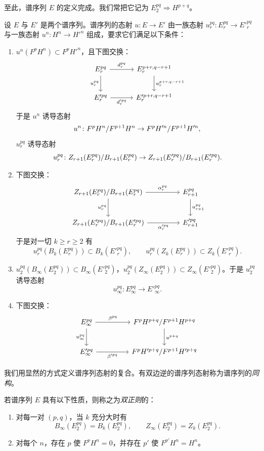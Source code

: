 至此，谱序列 $E$ 的定义完成。我们常把它记为 $E_2^{pq}\Rightarrow H^{p+q}$。

设 $E$ 与 $E'$ 是两个谱序列。谱序列的态射 $u\colon E\to E'$ 由一族态射 $u_r^{pq}\colon E_r^{pq}\to E'^{pq}_r$ 与一族态射 $u^n\colon H^n\to H'^n$ 组成，要求它们满足以下条件：
\begin{enumerate}[label=(\roman*),leftmargin=2.8em]
  \item $u^n(F^pH^n)\subset F^pH'^n$，且下图交换：
  \[\begin{tikzcd}[column sep=3.2em,row sep=2.2em]
  E_r^{pq} \arrow[r,"d_r^{pq}"] \arrow[d,"u_r^{pq}"'] & E_r^{p+r,q-r+1} \arrow[d,"u_r^{p+r,q-r+1}"] \\
  E'^{pq}_r \arrow[r,"d'^{pq}_r"'] & E'^{p+r,q-r+1}_r
  \end{tikzcd}\]
  于是 $u^n$ 诱导态射
  \[
  u^n\colon F^pH^n/F^{p+1}H^n\to F^pH'^n/F^{p+1}H'^n,
  \]
  $u_r^{pq}$ 诱导态射
  \[
  u_r^{pq}\colon Z_{r+1}(E_r^{pq})/B_{r+1}(E_r^{pq})\to Z_{r+1}(E'^{pq}_r)/B_{r+1}(E'^{pq}_r).
  \]
  \item 下图交换：
  \[\begin{tikzcd}[column sep=4.6em,row sep=2.4em]
  Z_{r+1}(E_r^{pq})/B_{r+1}(E_r^{pq}) \arrow[r,"\alpha_r^{pq}"] \arrow[d,"\ol u_r^{pq}"'] & E_{r+1}^{pq} \arrow[d,"u_{r+1}^{pq}"] \\
  Z_{r+1}(E'^{pq}_r)/B_{r+1}(E'^{pq}_r) \arrow[r,"\alpha'^{pq}_r"'] & E'^{pq}_{r+1}
  \end{tikzcd}\]
  于是对一切 $k\ge r\ge 2$ 有
  \[
  u_r^{pq}(B_k(E_r^{pq}))\subset B_k(E'^{pq}_r),\qquad u_r^{pq}(Z_k(E_r^{pq}))\subset Z_k(E'^{pq}_r).
  \]
  \item $u_2^{pq}(B_\infty(E_2^{pq}))\subset B_\infty(E'^{pq}_2)$，$u_2^{pq}(Z_\infty(E_2^{pq}))\subset Z_\infty(E'^{pq}_2)$。于是 $u_2^{pq}$ 诱导态射
  \[
  u_\infty^{pq}\colon E_\infty^{pq}\to E'^{pq}_\infty.
  \]
  \item 下图交换：
  \[\begin{tikzcd}[column sep=4.6em,row sep=2.4em]
  E_\infty^{pq} \arrow[r,"\beta^{pq}"] \arrow[d,"u_\infty^{pq}"'] & F^pH^{p+q}/F^{p+1}H^{p+q} \arrow[d,"\ol u^{p+q}"] \\
  E'^{pq}_\infty \arrow[r,"\beta'^{pq}"'] & F^pH'^{p+q}/F^{p+1}H'^{p+q}
  \end{tikzcd}\]
\end{enumerate}

我们用显然的方式定义谱序列态射的复合。有双边逆的谱序列态射称为谱序列的\emph{同构}。

若谱序列 $E$ 具有以下性质，则称之为\emph{双正则}的：
\begin{enumerate}[label=(\roman*),leftmargin=2.8em]
  \item 对每一对 $(p,q)$，当 $k$ 充分大时有
  \[
  B_\infty(E_2^{pq})=B_k(E_2^{pq}),\qquad Z_\infty(E_2^{pq})=Z_k(E_2^{pq}).
  \]
  \item 对每个 $n$，存在 $p$ 使 $F^pH^n=0$，并存在 $p'$ 使 $F^{p'}H^n=H^n$。
\end{enumerate}

